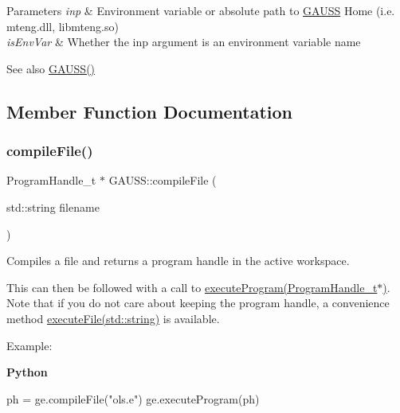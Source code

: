\begin{DoxyParams}{Parameters}
{\em inp} & Environment variable or absolute path to \hyperlink{class_g_a_u_s_s}{G\+A\+U\+SS} Home (i.\+e. mteng.\+dll, libmteng.\+so) \\
\hline
{\em is\+Env\+Var} & Whether the {\ttfamily inp} argument is an environment variable name\\
\hline
\end{DoxyParams}
\begin{DoxySeeAlso}{See also}
\hyperlink{class_g_a_u_s_s_a693f5380e15621bb955989e243b902cd}{G\+A\+U\+S\+S()} 
\end{DoxySeeAlso}


\subsection{Member Function Documentation}
\mbox{\label{class_g_a_u_s_s_a981bdafede1af555a73b9abe05333341}} 
\subsubsection{\texorpdfstring{compile\+File()}{compileFile()}\hspace{0.1cm}{\footnotesize\ttfamily [1/2]}}
{\footnotesize\ttfamily Program\+Handle\+\_\+t $\ast$ G\+A\+U\+S\+S\+::compile\+File (\begin{DoxyParamCaption}\item[{std\+::string}]{filename }\end{DoxyParamCaption})}



Compiles a file and returns a program handle in the active workspace. 

This can then be followed with a call to \hyperlink{class_g_a_u_s_s_a7fc9de69421c14aadb9a6310fecabcca}{execute\+Program(\+Program\+Handle\+\_\+t$\ast$)}. Note that if you do not care about keeping the program handle, a convenience method \hyperlink{class_g_a_u_s_s_a949037ab9f5c49d94a0c7962dac0548d}{execute\+File(std\+::string)} is available.

Example\+:

{\bfseries Python} 
\begin{DoxyCode}
ph = ge.compileFile(\textcolor{stringliteral}{"ols.e"})
ge.executeProgram(ph)
\end{DoxyCode}



